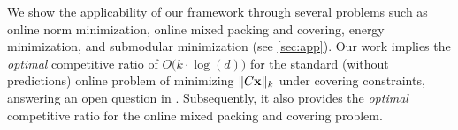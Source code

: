We show the applicability of our framework through several problems such as online norm minimization, online mixed packing and covering,
energy minimization, and submodular minimization (see \cref{sec:app}).
Our work implies the \emph{optimal} competitive ratio of $O\bigl( k \cdot \log (d)\bigr)$
for the standard (without predictions) online problem of minimizing $\|C \mathbf{x}\|_{k}$ under covering constraints, answering an open question in \cite{NagarajanShen17:Online-Covering}. Subsequently, it also provides the \emph{optimal} competitive ratio for the online mixed packing and covering problem.

%
%
%
%
